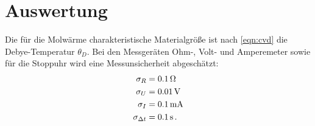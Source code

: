 \section{Auswertung}
\label{sec:Auswertung}
Die für die Molwärme charakteristische Materialgröße ist nach \eqref{eqn:cvd} die Debye-Temperatur $\theta_D$. 
Bei den Messgeräten Ohm-, Volt- und Amperemeter sowie für die Stoppuhr wird eine Messunsicherheit abgeschätzt:
\begin{align*}
	\sigma_R &= \SI{0.1}{\ohm}\\
	\sigma_U &= \SI{0.01}{\volt}\\
	\sigma_I &= \SI{0.1}{\milli\ampere}\\
	\sigma_{\Delta t} &= \SI{0.1}{\second}	\,\text.
\end{align*}
